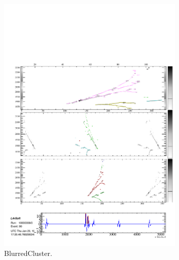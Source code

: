 \begin{figure}
  \centering
  \begin{subfigure}[t]{0.48\linewidth}
    \centering
    \includegraphics[width=0.98\textwidth]{EVDPi0Clusters.pdf}
    \caption{BlurredCluster.}
    \label{fig:pi0ShowersTracksClusters}
  \end{subfigure}
  \hfill
  \begin{subfigure}[t]{0.48\linewidth}
    \centering

\end{subfigure}
\end{figure}
